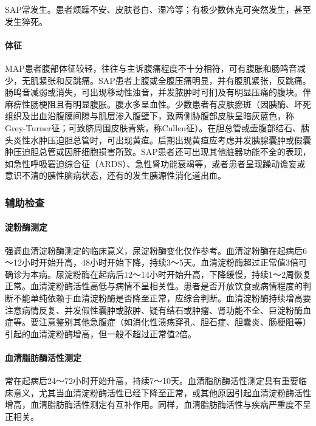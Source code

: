 SAP常发生。患者烦躁不安、皮肤苍白、湿冷等；有极少数休克可突然发生，甚至发生猝死。

\paragraph{体征}

MAP患者腹部体征较轻，往往与主诉腹痛程度不十分相符，可有腹胀和肠鸣音减少，无肌紧张和反跳痛。SAP患者上腹或全腹压痛明显，并有腹肌紧张，反跳痛。肠鸣音减弱或消失，可出现移动性浊音，并发脓肿时可扪及有明显压痛的腹块。伴麻痹性肠梗阻且有明显腹胀。腹水多呈血性。少数患者有皮肤瘀斑（因胰酶、坏死组织及出血沿腹膜间隙与肌层渗入腹壁下，致两侧胁腹部皮肤呈暗灰蓝色，称Grey-Turner征；可致脐周围皮肤青紫，称Cullen征）。在胆总管或壶腹部结石、胰头炎性水肿压迫胆总管时，可出现黄疸。后期出现黄疸应考虑并发胰腺囊肿或假囊肿压迫胆总管或因肝细胞损害所致。SAP患者还可出现其他脏器功能不全的表现，如急性呼吸窘迫综合征（ARDS）、急性肾功能衰竭等，或者患者呈现躁动谵妄或意识不清的胰性脑病状态，还有的发生胰源性消化道出血。

\subsubsection{辅助检查}

\paragraph{淀粉酶测定}

强调血清淀粉酶测定的临床意义，尿淀粉酶变化仅作参考。血清淀粉酶在起病后6～12小时开始升高，48小时开始下降，持续3～5天。血清淀粉酶超过正常值3倍可确诊为本病。尿淀粉酶在起病后12～14小时开始升高，下降缓慢，持续1～2周恢复正常。血清淀粉酶活性高低与病情不呈相关性。患者是否开放饮食或病情程度的判断不能单纯依赖于血清淀粉酶是否降至正常，应综合判断。血清淀粉酶持续增高要注意病情反复、并发假性囊肿或脓肿、疑有结石或肿瘤、肾功能不全、巨淀粉酶血症等。要注意鉴别其他急腹症（如消化性溃疡穿孔、胆石症、胆囊炎、肠梗阻等）引起的血清淀粉酶增高，但一般不超过正常值2倍。

\paragraph{血清脂肪酶活性测定}

常在起病后24～72小时开始升高，持续7～10天。血清脂肪酶活性测定具有重要临床意义，尤其当血清淀粉酶活性已经下降至正常，或其他原因引起血清淀粉酶活性增高，血清脂肪酶活性测定有互补作用。同样，血清脂肪酶活性与疾病严重度不呈正相关。

